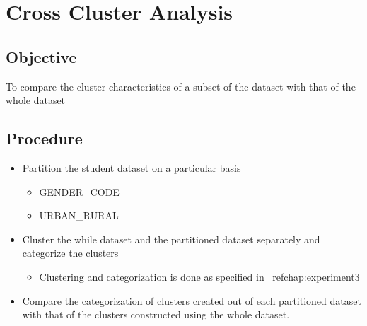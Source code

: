 \chapter{Cross Cluster Analysis}

\section*{Objective}
To compare the cluster characteristics of a subset of the dataset with that of the whole dataset

\section*{Procedure}
\begin{itemize}
\item Partition the student dataset on a particular basis
\begin{itemize}
\item GENDER{\_}CODE
\item URBAN{\_}RURAL
\end{itemize}
\item Cluster the while dataset and the partitioned dataset separately and categorize the clusters
\begin{itemize}
\item Clustering and categorization is done as specified in ~ref{chap:experiment3}
\end{itemize}
\item Compare the categorization of clusters created out of each partitioned dataset with that of the clusters constructed using the whole dataset.
\end{itemize}

